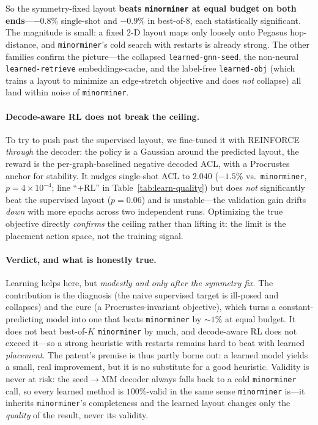 \documentclass[acmsmall,anonymous,nonacm]{acmart}
\begin{document}
So the symmetry-fixed layout \textbf{beats \texttt{minorminer} at equal budget on both
ends}---$-0.8\%$ single-shot and $-0.9\%$ in best-of-$8$, each statistically
significant. The magnitude is small: a fixed $2$-D layout maps only loosely onto
Pegasus hop-distance, and \texttt{minorminer}'s cold search with restarts is already
strong. The other families confirm the picture---the collapsed \texttt{learned-gnn-seed},
the non-neural \texttt{learned-retrieve} embeddings-cache, and the label-free
\texttt{learned-obj} (which trains a layout to minimize an edge-stretch objective and
does \emph{not} collapse) all land within noise of \texttt{minorminer}.

\paragraph{Decode-aware RL does not break the ceiling.} To try to push past the
supervised layout, we fine-tuned it with REINFORCE \emph{through} the decoder: the
policy is a Gaussian around the predicted layout, the reward is the per-graph-baselined
negative decoded ACL, with a Procrustes anchor for stability. It nudges single-shot ACL
to $2.040$ ($-1.5\%$ vs.\ \texttt{minorminer}, $p{=}4{\times}10^{-4}$; line ``$+$RL'' in
Table~\ref{tab:learn-quality}) but does \emph{not} significantly beat the supervised
layout ($p{=}0.06$) and is unstable---the validation gain drifts \emph{down} with more
epochs across two independent runs. Optimizing the true objective directly
\emph{confirms} the ceiling rather than lifting it: the limit is the placement action
space, not the training signal.

\paragraph{Verdict, and what is honestly true.} Learning helps here, but \emph{modestly
and only after the symmetry fix}. The contribution is the diagnosis (the naive
supervised target is ill-posed and collapses) and the cure (a Procrustes-invariant
objective), which turns a constant-predicting model into one that beats
\texttt{minorminer} by ${\sim}1\%$ at equal budget. It does not beat best-of-$K$
\texttt{minorminer} by much, and decode-aware RL does not exceed it---so a strong
heuristic with restarts remains hard to beat with learned \emph{placement}. The
patent's premise is thus partly borne out: a learned model yields a small, real
improvement, but it is no substitute for a good heuristic. Validity is never at risk:
the seed$\rightarrow$MM decoder always falls back to a cold \texttt{minorminer} call, so
every learned method is $100\%$-valid in the same sense \texttt{minorminer} is---it
inherits \texttt{minorminer}'s completeness and the learned layout changes only the
\emph{quality} of the result, never its validity.
\end{document}
